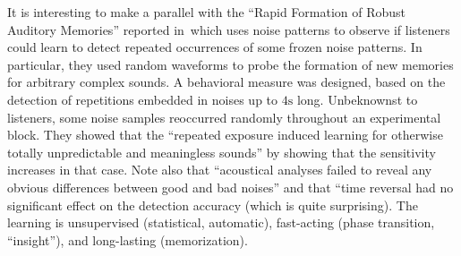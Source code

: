 \documentclass[brainsci, %
               review,accept,pdftex,moreauthors %
               ]{Definitions/mdpi}
\providecommand{\DIFadd}[1]{{\protect\color{blue}\uwave{#1}}} %
\providecommand{\DIFdel}[1]{{\protect\color{red}\sout{#1}}}                      %
\providecommand{\DIFaddbegin}{} %
\providecommand{\DIFaddend}{} %
\providecommand{\DIFdelbegin}{} %
\providecommand{\DIFdelend}{} %
\newcommand{\DIFscaledelfig}{0.5}
\newlength{\DIFdelgraphicswidth} %
\newlength{\DIFdelgraphicsheight} %
\newcommand{\DIFaddincludegraphics}[2][]{{\color{blue}\fbox{\DIFOincludegraphics[#1]{#2}}}} %
\newcommand{\DIFdelincludegraphics}[2][]{%
\sbox{\DIFdelgraphicsbox}{\DIFOincludegraphics[#1]{#2}}%
\settoboxwidth{\DIFdelgraphicswidth}{\DIFdelgraphicsbox} %
\settoboxtotalheight{\DIFdelgraphicsheight}{\DIFdelgraphicsbox} %
\scalebox{\DIFscaledelfig}{%
\parbox[b]{\DIFdelgraphicswidth}{\usebox{\DIFdelgraphicsbox}\\[-\baselineskip] \rule{\DIFdelgraphicswidth}{0em}}\llap{\resizebox{\DIFdelgraphicswidth}{\DIFdelgraphicsheight}{%
\setlength{\unitlength}{\DIFdelgraphicswidth}%
\begin{picture}(1,1)%
\thicklines\linethickness{2pt} %
{\color[rgb]{1,0,0}\put(0,0){\framebox(1,1){}}}%
{\color[rgb]{1,0,0}\put(0,0){\line( 1,1){1}}}%
{\color[rgb]{1,0,0}\put(0,1){\line(1,-1){1}}}%
\end{picture}%
}\hspace*{3pt}}} %
} %
\DeclareRobustCommand{\DIFaddbegin}{\DIFOaddbegin \let\includegraphics\DIFaddincludegraphics} %
\DeclareRobustCommand{\DIFaddend}{\DIFOaddend \let\includegraphics\DIFOincludegraphics} %
\DeclareRobustCommand{\DIFdelbegin}{\DIFOdelbegin \let\includegraphics\DIFdelincludegraphics} %
\DeclareRobustCommand{\DIFdelend}{\DIFOaddend \let\includegraphics\DIFOincludegraphics} %
\begin{document}
It is interesting to make a parallel with the ``Rapid Formation of Robust Auditory Memories'' reported in~\citep{agus_rapid_2010}\DIFaddbegin \DIFadd{, }\DIFaddend which uses noise patterns to observe if listeners could learn to detect repeated occurrences of some frozen noise patterns. In particular, they used random waveforms to probe the formation of new memories for arbitrary complex sounds. A behavioral measure was designed, based on the detection of repetitions embedded in noises up to \DIFdelbegin \DIFdel{$4 \si{\second}$ }\DIFdelend \DIFaddbegin \DIFadd{$4~ \si{\second}$ }\DIFaddend long. %
Unbeknownst to listeners, some noise samples reoccurred randomly throughout an experimental block. They showed that the ``repeated exposure induced learning for otherwise totally unpredictable and meaningless sounds'' by showing that the sensitivity increases in that case. Note also that ``acoustical analyses failed to reveal any obvious differences between good and bad noises'' and that ``time reversal had no significant effect on the detection accuracy (which is quite surprising). The learning is unsupervised (statistical, automatic), fast-acting (phase transition, ``insight''), and long-lasting (memorization). 
\end{document}

